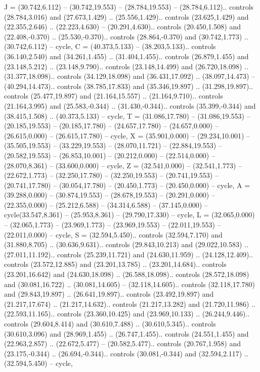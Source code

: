 {J} = {(30.742,6.112) -- (30.742,19.553) -- (28.784,19.553) -- (28.784,6.112).. controls (28.784,3.016) and (27.673,1.429) .. (25.556,1.429).. controls (23.625,1.429) and (22.355,2.646) .. (22.223,4.630) -- (20.291,4.630).. controls (20.450,1.508) and (22.408,-0.370) .. (25.530,-0.370).. controls (28.864,-0.370) and (30.742,1.773) .. (30.742,6.112) -- cycle},
{C} = {(40.373,5.133) -- (38.203,5.133).. controls (36.140,2.540) and (34.261,1.455) .. (31.404,1.455).. controls (26.879,1.455) and (23.148,5.212) .. (23.148,9.790).. controls (23.148,14.499) and (26.720,18.098) .. (31.377,18.098).. controls (34.129,18.098) and (36.431,17.092) .. (38.097,14.473) -- (40.294,14.473).. controls (38.785,17.833) and (35.346,19.897) .. (31.298,19.897).. controls (25.477,19.897) and (21.164,15.557) .. (21.164,9.710).. controls (21.164,3.995) and (25.583,-0.344) .. (31.430,-0.344).. controls (35.399,-0.344) and (38.415,1.508) .. (40.373,5.133) -- cycle},
{T} = {(31.086,17.780) -- (31.086,19.553) -- (20.185,19.553) -- (20.185,17.780) -- (24.657,17.780) -- (24.657,0.000) -- (26.615,0.000) -- (26.615,17.780) -- cycle},
{X} = {(35.901,0.000) -- (29.234,10.001) -- (35.505,19.553) -- (33.229,19.553) -- (28.070,11.721) -- (22.884,19.553) -- (20.582,19.553) -- (26.853,10.001) -- (20.212,0.000) -- (22.514,0.000) -- (28.070,8.361) -- (33.600,0.000) -- cycle},
{Z} = {(32.541,0.000) -- (32.541,1.773) -- (22.672,1.773) -- (32.250,17.780) -- (32.250,19.553) -- (20.741,19.553) -- (20.741,17.780) -- (30.054,17.780) -- (20.450,1.773) -- (20.450,0.000) -- cycle},
{A} = {(39.288,0.000) -- (30.874,19.553) -- (28.678,19.553) -- (20.291,0.000) -- (22.355,0.000) -- (25.212,6.588) -- (34.314,6.588) -- (37.145,0.000) -- cycle(33.547,8.361) -- (25.953,8.361) -- (29.790,17.330) -- cycle},
{L} = {(32.065,0.000) -- (32.065,1.773) -- (23.969,1.773) -- (23.969,19.553) -- (22.011,19.553) -- (22.011,0.000) -- cycle},
{S} = {(32.594,5.450).. controls (32.594,7.170) and (31.880,8.705) .. (30.636,9.631).. controls (29.843,10.213) and (29.022,10.583) .. (27.011,11.192).. controls (25.239,11.721) and (24.630,11.959) .. (24.128,12.409).. controls (23.572,12.885) and (23.201,13.785) .. (23.201,14.684).. controls (23.201,16.642) and (24.630,18.098) .. (26.588,18.098).. controls (28.572,18.098) and (30.081,16.722) .. (30.081,14.605) -- (32.118,14.605).. controls (32.118,17.780) and (29.843,19.897) .. (26.641,19.897).. controls (23.492,19.897) and (21.217,17.674) .. (21.217,14.632).. controls (21.217,13.282) and (21.720,11.986) .. (22.593,11.165).. controls (23.360,10.425) and (23.969,10.133) .. (26.244,9.446).. controls (29.604,8.414) and (30.610,7.488) .. (30.610,5.345).. controls (30.610,3.096) and (28.969,1.455) .. (26.747,1.455).. controls (24.551,1.455) and (22.963,2.857) .. (22.672,5.477) -- (20.582,5.477).. controls (20.767,1.958) and (23.175,-0.344) .. (26.694,-0.344).. controls (30.081,-0.344) and (32.594,2.117) .. (32.594,5.450) -- cycle},
